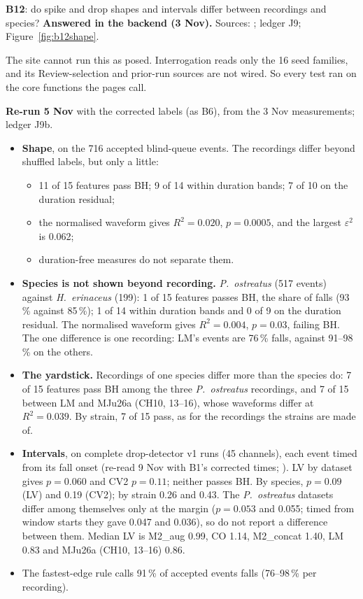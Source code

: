 \begin{instructions}
\textbf{B12}: do spike and drop shapes and intervals differ between recordings and species? \textbf{Answered in the
backend (3 Nov).} Sources: ; ledger J9;
Figure~\ref{fig:b12shape}.

The site cannot run this as posed. Interrogation reads only the 16 seed families, and its Review-selection and
prior-run sources are not wired. So every test ran on the core functions the pages call.

\textbf{Re-run 5 Nov} with the corrected labels (as B6), from the 3 Nov measurements; ledger J9b.
\begin{itemize}
  \item \textbf{Shape}, on the 716 accepted blind-queue events. The recordings differ beyond shuffled labels, but only a
        little:
        \begin{itemize}
          \item 11 of 15 features pass BH; 9 of 14 within duration bands; 7 of 10 on the duration residual;
          \item the normalised waveform gives $R^2=0.020$, $p=0.0005$, and the largest $\varepsilon^2$ is 0.062;
          \item duration-free measures do not separate them.
        \end{itemize}
  \item \textbf{Species is not shown beyond recording.} \emph{P.\ ostreatus} (517 events) against \emph{H.\ erinaceus}
        (199): 1 of 15 features passes BH, the share of falls (93\,\% against 85\,\%); 1 of 14 within duration bands and
        0 of 9 on the duration residual. The normalised waveform gives $R^2=0.004$, $p=0.03$, failing BH. The one
        difference is one recording: LM's events are 76\,\% falls, against 91--98\,\% on the others.
  \item \textbf{The yardstick.} Recordings of one species differ more than the species do: 7 of 15 features pass BH
        among the three \emph{P.\ ostreatus} recordings, and 7 of 15 between LM and MJu26a (CH10, 13--16), whose
        waveforms differ at $R^2=0.039$. By strain, 7 of 15 pass, as for the recordings the strains are made of.
  \item \textbf{Intervals}, on complete drop-detector v1 runs (45 channels), each event timed from its fall onset
        (re-read 9 Nov with B1's corrected times; ). LV by dataset gives
        $p=0.060$ and CV2 $p=0.11$; neither passes BH. By species, $p=0.09$ (LV) and 0.19 (CV2); by strain 0.26 and
        0.43. The \emph{P.\ ostreatus} datasets differ among themselves only at the margin ($p=0.053$ and 0.055; timed
        from window starts they gave 0.047 and 0.036), so do not report a difference between them. Median LV is M2\_aug
        0.99, CO 1.14, M2\_concat 1.40, LM 0.83 and MJu26a (CH10, 13--16) 0.86.
  \item The fastest-edge rule calls 91\,\% of accepted events falls (76--98\,\% per recording).
\end{itemize}
\end{instructions}


